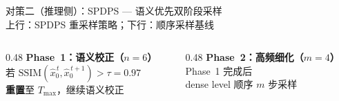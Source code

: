 \documentclass[aspectratio=169,10pt]{beamer}
\begin{document}
\begin{frame}{对策二（推理侧）：SPDPS — 语义优先双阶段采样}
  \vspace{0.3em}
  \centering
  \\[0.5em]
  \footnotesize\color{InkSoft} 上行：SPDPS 重采样策略；下行：顺序采样基线
  \vspace{0.5em}

  \begin{columns}[T,onlytextwidth]
    \begin{column}{0.48\textwidth}
      \textbf{Phase~1：语义校正（$n=6$）}
      \\[3pt]
      \centering
      若 $\mathrm{SSIM}(\hat{x}_0^{\,t},\hat{x}_0^{\,t+1})>\tau=0.97$
      \\[3pt]
      \textbf{重置}至 $T_{\max}$，继续语义校正
    \end{column}
    \begin{column}{0.48\textwidth}
      \textbf{Phase~2：高频细化（$m=4$）}
      \\[3pt]
      \centering
      Phase~1 完成后
      \\[3pt]
      dense level 顺序 $m$ 步采样
    \end{column}
  \end{columns}
\end{frame}
\end{document}
